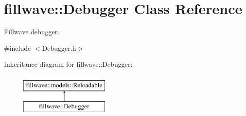 \hypertarget{classfillwave_1_1Debugger}{}\section{fillwave\+:\+:Debugger Class Reference}
\label{classfillwave_1_1Debugger}


Fillwave debugger.  




{\ttfamily \#include $<$Debugger.\+h$>$}

Inheritance diagram for fillwave\+:\+:Debugger\+:\begin{figure}[H]
\begin{center}
\leavevmode
\includegraphics[height=2.000000cm]{classfillwave_1_1Debugger}
\end{center}
\end{figure}
